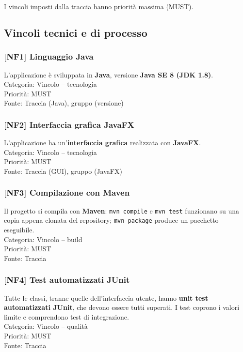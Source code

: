 I vincoli imposti dalla traccia hanno priorità massima (MUST).

\subsection{Vincoli tecnici e di processo}
\subsubsection{[NF1] Linguaggio Java}
L'applicazione è sviluppata in \textbf{Java}, versione \textbf{Java SE 8 (JDK 1.8)}.\\
Categoria: Vincolo – tecnologia\\Priorità: MUST\\Fonte: Traccia (Java), gruppo (versione)

\subsubsection{[NF2] Interfaccia grafica JavaFX}
L'applicazione ha un'\textbf{interfaccia grafica} realizzata con \textbf{JavaFX}.\\
Categoria: Vincolo – tecnologia\\Priorità: MUST\\Fonte: Traccia (GUI), gruppo (JavaFX)

\subsubsection{[NF3] Compilazione con Maven}
Il progetto si compila con \textbf{Maven}: \texttt{mvn compile} e \texttt{mvn test} funzionano su una copia appena clonata del repository; \texttt{mvn package} produce un pacchetto eseguibile.\\
Categoria: Vincolo – build\\Priorità: MUST\\Fonte: Traccia

\subsubsection{[NF4] Test automatizzati JUnit}
Tutte le classi, tranne quelle dell'interfaccia utente, hanno \textbf{unit test automatizzati JUnit}, che devono essere tutti superati. I test coprono i valori limite e comprendono test di integrazione.\\
Categoria: Vincolo – qualità\\Priorità: MUST\\Fonte: Traccia

